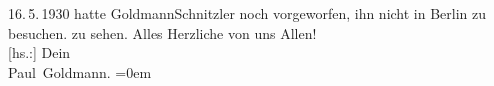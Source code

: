 \begin{ledgroupsized}[t]{13cm}
{{{                     16. 5. 1930 hatte
                     GoldmannSchnitzler noch vorgeworfen, ihn nicht in
                     Berlin zu besuchen.}}}\label{K_L03516-2h} zu sehen.\pend
           \pstart
           Alles Herzliche von uns Allen! {\\[\baselineskip]}{[}hs.:{]} Dein {\\[\baselineskip]}\spacefill\mbox{Paul Goldmann.}\pend
           \leftskip=0em{}
         
         \endnumbering{}\end{ledgroupsized}\begin{anhang}\end{anhang}\newcommand{\dateiname}{L03516}\newcommand{\titel}{Paul Goldmann an Arthur Schnitzler, 3. 5. 1928}\newcommand{\editorInnen}{Martin Anton Müller und Laura Untner}
      